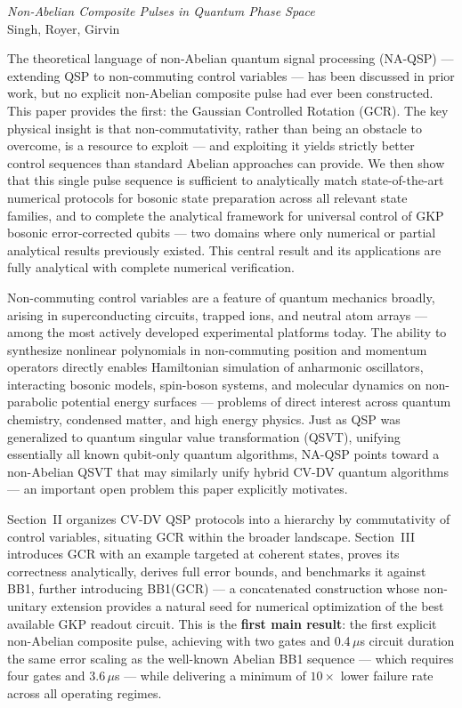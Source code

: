 \documentclass[11pt, letterpaper]{article}
\begin{document}
\begin{center}
{\large \textit{Non-Abelian Composite Pulses in Quantum Phase Space}}\\[2pt]
Singh, Royer, Girvin
\end{center}

\vspace{4pt}

The theoretical language of non-Abelian quantum signal processing (NA-QSP) --- extending QSP to non-commuting control variables --- has been discussed in prior work, but no explicit non-Abelian composite pulse had ever been constructed. This paper provides the first: the Gaussian Controlled Rotation (GCR). The key physical insight is that non-commutativity, rather than being an obstacle to overcome, is a resource to exploit --- and exploiting it yields strictly better control sequences than standard Abelian approaches can provide. We then show that this single pulse sequence is sufficient to analytically match state-of-the-art numerical protocols for bosonic state preparation across all relevant state families, and to complete the analytical framework for universal control of GKP bosonic error-corrected qubits --- two domains where only numerical or partial analytical results previously existed. This central result and its applications are fully analytical with complete numerical verification.

Non-commuting control variables are a feature of quantum mechanics broadly, arising in superconducting circuits, trapped ions, and neutral atom arrays --- among the most actively developed experimental platforms today. The ability to synthesize nonlinear polynomials in non-commuting position and momentum operators directly enables Hamiltonian simulation of anharmonic oscillators, interacting bosonic models, spin-boson systems, and molecular dynamics on non-parabolic potential energy surfaces --- problems of direct interest across quantum chemistry, condensed matter, and high energy physics. Just as QSP was generalized to quantum singular value transformation (QSVT), unifying essentially all known qubit-only quantum algorithms, NA-QSP points toward a non-Abelian QSVT that may similarly unify hybrid CV-DV quantum algorithms --- an important open problem this paper explicitly motivates.

Section~II organizes CV-DV QSP protocols into a hierarchy by commutativity of control variables, situating GCR within the broader landscape. Section~III introduces GCR with an example targeted at coherent states, proves its correctness analytically, derives full error bounds, and benchmarks it against BB1, further introducing BB1(GCR) --- a concatenated construction whose non-unitary extension provides a natural seed for numerical optimization of the best available GKP readout circuit. This is the \textbf{first main result}: the first explicit non-Abelian composite pulse, achieving with two gates and 0.4\,$\mu$s circuit duration the same error scaling as the well-known Abelian BB1 sequence --- which requires four gates and 3.6\,$\mu$s --- while delivering a minimum of $10\times$ lower failure rate across all operating regimes.
\end{document}
